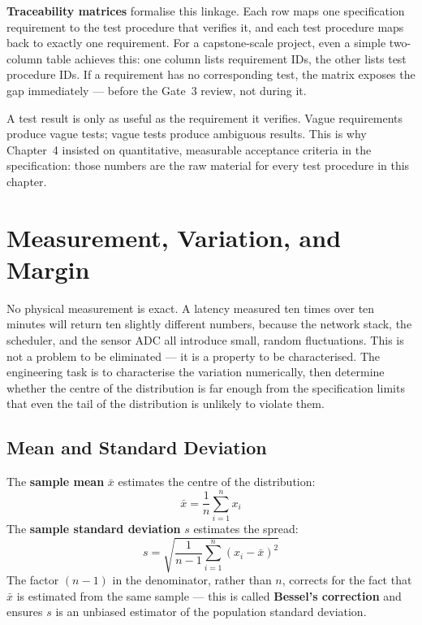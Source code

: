 \textbf{Traceability matrices} formalise this linkage.
Each row maps one specification requirement to the test procedure that verifies it, and
each test procedure maps back to exactly one requirement.
For a capstone-scale project, even a simple two-column table achieves this:
one column lists requirement IDs, the other lists test procedure IDs.
If a requirement has no corresponding test, the matrix exposes the gap immediately ---
before the Gate~3 review, not during it.

A test result is only as useful as the requirement it verifies.
Vague requirements produce vague tests; vague tests produce ambiguous results.
This is why Chapter~4 insisted on quantitative, measurable acceptance criteria in the
specification: those numbers are the raw material for every test procedure in this chapter.

\section{Measurement, Variation, and Margin}
\label{sec:ch14-measurement}

No physical measurement is exact.
A latency measured ten times over ten minutes will return ten slightly different numbers,
because the network stack, the scheduler, and the sensor ADC all introduce small, random
fluctuations.
This is not a problem to be eliminated --- it is a property to be characterised.
The engineering task is to characterise the variation numerically, then determine whether
the centre of the distribution is far enough from the specification limits that even the
tail of the distribution is unlikely to violate them.

\subsection{Mean and Standard Deviation}
\label{subsec:ch14-mean-std}

The
\textbf{sample mean} $\bar{x}$ estimates the centre of the distribution:
\begin{equation}
  \bar{x} = \frac{1}{n} \sum_{i=1}^{n} x_i
  \label{eq:ch14-mean}
\end{equation}
The \textbf{sample standard deviation} $s$ estimates the spread:
\begin{equation}
  s = \sqrt{\frac{1}{n-1} \sum_{i=1}^{n} (x_i - \bar{x})^2}
  \label{eq:ch14-std}
\end{equation}
The factor $(n-1)$ in the denominator, rather than $n$, corrects for the fact that
$\bar{x}$ is estimated from the same sample --- this is called \textbf{Bessel's
correction} and ensures $s$ is an unbiased estimator of the
population standard deviation.

